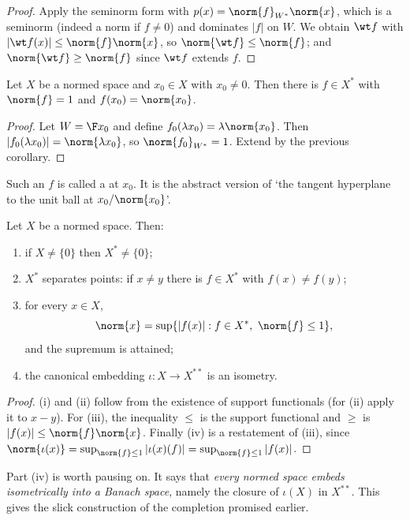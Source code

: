 \begin{proof}
	Apply the seminorm form with $p(x) = \norm{f}_{W^*}\norm{x}$, which is a seminorm (indeed a norm if $f \neq 0$) and dominates $|f|$ on $W$. We obtain $\wt f$ with $|\wt f(x)| \leq \norm{f}\norm{x}$, so $\norm{\wt f} \leq \norm{f}$; and $\norm{\wt f} \geq \norm{f}$ since $\wt f$ extends $f$.
\end{proof}

\begin{corollary}
	Let $X$ be a normed space and $x_0 \in X$ with $x_0 \neq 0$. Then there is $f \in X^*$ with $\norm{f} = 1$ and $f(x_0) = \norm{x_0}$.
\end{corollary}

\begin{proof}
	Let $W = \F x_0$ and define $f_0(\lambda x_0) = \lambda \norm{x_0}$. Then $|f_0(\lambda x_0)| = \norm{\lambda x_0}$, so $\norm{f_0}_{W^*} = 1$. Extend by the previous corollary.
\end{proof}

Such an $f$ is called a  at $x_0$. It is the abstract version of `the tangent hyperplane to the unit ball at $x_0/\norm{x_0}$'.

\begin{corollary}
	Let $X$ be a normed space. Then:
	\begin{enumerate}[label=(\roman*)]
		\item if $X \neq \{0\}$ then $X^* \neq \{0\}$;
		\item $X^*$ separates points: if $x \neq y$ there is $f \in X^*$ with $f(x) \neq f(y)$;
		\item for every $x \in X$,
		$$\norm{x} = \sup \{ |f(x)| : f \in X^*, \ \norm{f} \leq 1 \},$$
		and the supremum is attained;
		\item the canonical embedding $\iota : X \to X^{**}$ is an isometry.
	\end{enumerate}
\end{corollary}

\begin{proof}
	(i) and (ii) follow from the existence of support functionals (for (ii) apply it to $x - y$). For (iii), the inequality $\leq$ is the support functional and $\geq$ is $|f(x)| \leq \norm{f}\norm{x}$. Finally (iv) is a restatement of (iii), since $\norm{\iota(x)} = \sup_{\norm{f}\leq 1}|\iota(x)(f)| = \sup_{\norm{f}\leq 1}|f(x)|$.
\end{proof}

Part (iv) is worth pausing on. It says that \emph{every normed space embeds isometrically into a Banach space}, namely the closure of $\iota(X)$ in $X^{**}$. This gives the slick construction of the completion promised earlier.

